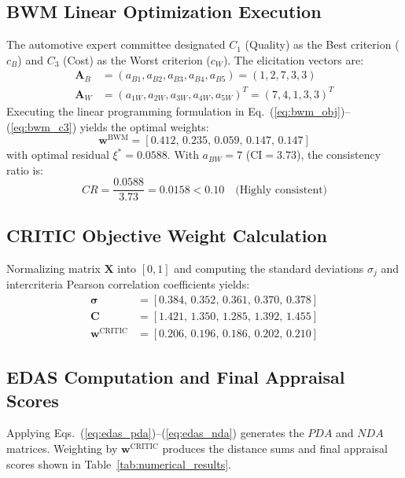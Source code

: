 \documentclass[twocolumn,10pt]{article}
\begin{document}
\subsection{BWM Linear Optimization Execution}
The automotive expert committee designated $C_1$ (Quality) as the Best criterion ($c_B$) and $C_3$ (Cost) as the Worst criterion ($c_W$). The elicitation vectors are:
\begin{align*}
    \mathbf{A}_B &= (a_{B1}, a_{B2}, a_{B3}, a_{B4}, a_{B5}) = (1, 2, 7, 3, 3) \\
    \mathbf{A}_W &= (a_{1W}, a_{2W}, a_{3W}, a_{4W}, a_{5W})^T = (7, 4, 1, 3, 3)^T
\end{align*}
Executing the linear programming formulation in Eq.~(\ref{eq:bwm_obj})--(\ref{eq:bwm_c3}) yields the optimal weights:
\begin{equation*}
    \mathbf{w}^{\text{BWM}} = [0.412, \, 0.235, \, 0.059, \, 0.147, \, 0.147]
\end{equation*}
with optimal residual $\xi^* = 0.0588$. With $a_{BW} = 7$ ($\text{CI} = 3.73$), the consistency ratio is:
\begin{equation*}
    CR = \frac{0.0588}{3.73} = 0.0158 < 0.10 \quad \text{(Highly consistent)}
\end{equation*}

\subsection{CRITIC Objective Weight Calculation}
Normalizing matrix $\mathbf{X}$ into $[0, 1]$ and computing the standard deviations $\sigma_j$ and intercriteria Pearson correlation coefficients yields:
\begin{align*}
    \boldsymbol{\sigma} &= [0.384, \, 0.352, \, 0.361, \, 0.370, \, 0.378] \\
    \mathbf{C} &= [1.421, \, 1.350, \, 1.285, \, 1.392, \, 1.455] \\
    \mathbf{w}^{\text{CRITIC}} &= [0.206, \, 0.196, \, 0.186, \, 0.202, \, 0.210]
\end{align*}

\subsection{EDAS Computation and Final Appraisal Scores}
Applying Eqs.~(\ref{eq:edas_pda})--(\ref{eq:edas_nda}) generates the $PDA$ and $NDA$ matrices. Weighting by $\mathbf{w}^{\text{CRITIC}}$ produces the distance sums and final appraisal scores shown in Table~\ref{tab:numerical_results}.
\end{document}
